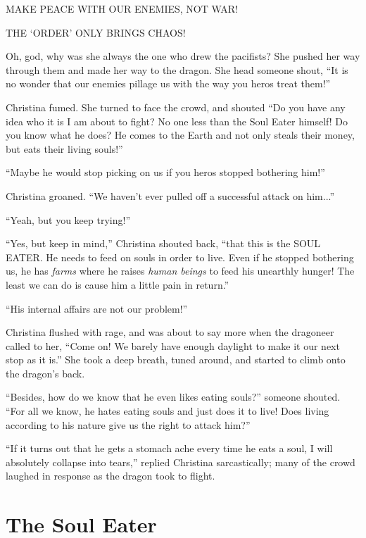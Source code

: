 \documentclass[showtrims,b6paper,draft,10pt]{memoir}
\begin{document}
MAKE PEACE WITH OUR ENEMIES, NOT WAR!

THE `ORDER' ONLY BRINGS CHAOS!

Oh, god, why was she always the one who drew the pacifists?  She pushed her way through them and made her way to the dragon.  She head someone shout,  ``It is no wonder that our enemies pillage us with the way you heros treat them!''

Christina fumed.  She turned to face the crowd, and shouted ``Do you have any idea who it is I am about to fight?  No one less than the Soul Eater himself!  Do you know what he does?  He comes to the Earth and not only steals their money, but eats their living souls!''

``Maybe he would stop picking on us if you heros stopped bothering him!''

Christina groaned.  ``We haven't ever pulled off a successful attack on him...''

``Yeah, but you keep trying!''

``Yes, but keep in mind,''  Christina shouted back, ``that this is the SOUL EATER.  He needs to feed on souls in order to live.  Even if he stopped bothering us, he has \emph{farms} where he raises \emph{human beings} to feed his unearthly hunger!  The least we can do is cause him a little pain in return.''

``His internal affairs are not our problem!''

Christina flushed with rage, and was about to say more when the dragoneer called to her, ``Come on!  We barely have enough daylight to make it our next stop as it is.''  She took a deep breath, tuned around, and started to climb onto the dragon's back.

``Besides, how do we know that he even likes eating souls?''  someone shouted.  ``For all we know, he hates eating souls and just does it to live!  Does living according to his nature give us the right to attack him?''

``If it turns out that he gets a stomach ache every time he eats a soul, I will absolutely collapse into tears,'' replied Christina sarcastically;  many of the crowd laughed in response as the dragon took to flight.

\timeskip
\chapter{The Soul Eater}
\end{document}
